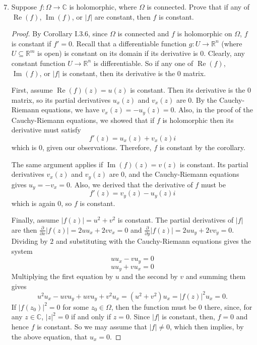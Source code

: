 \documentclass[10pt]{article}
\newcommand{\R}{\mathbb{R}}
\newcommand{\C}{\mathbb{C}}
\DeclareMathOperator*{\re}{Re}
\DeclareMathOperator*{\im}{Im}
\begin{document}

\begin{enumerate}
\setcounter{enumi}{6}
\item Suppose $f: \Omega \rightarrow \C$ is holomorphic, where $\Omega$ is connected.  Prove that if any of $\re(f)$, $\im(f)$, or $|f|$ are constant, then $f$ is constant.

\begin{proof}
By Corollary I.3.6, since $\Omega$ is connected and $f$ is holomorphic on $\Omega$, $f$ is constant if $f' = 0$.  Recall that a differentiable function $g: U \rightarrow \R^n$ (where $U \subseteq \R^m$ is open) is constant on its domain if its derivative is $0$.  Clearly, any constant function $U \rightarrow \R^n$ is differentiable.  So if any one of $\re(f)$, $\im(f)$, or $|f|$ is constant, then its derivative is the 0 matrix.

First, assume $\re(f)(z) = u(z)$ is constant.  Then its derivative is the 0 matrix, so its partial derivatives $u_x(z)$ and $v_x(z)$ are 0.  By the Cauchy-Riemann equations, we have $v_x(z) = -u_y(z) = 0$.  Also, in the proof of the Cauchy-Riemann equations, we showed that if $f$ is holomorphic then its derivative must satisfy
$$
f'(z) = u_x(z) + v_x(z)i
$$
which is 0, given our observations.  Therefore, $f$ is constant by the corollary.

The same argument applies if $\im(f)(z) = v(z)$ is constant.  Its partial derivatives $v_x(z)$ and $v_y(z)$ are 0, and the Cauchy-Riemann equations gives $u_y = -v_x = 0$.  Also, we derived that the derivative of $f$ must be
$$
f'(z) = v_y(z) - u_y(z)i
$$
which is again 0, so $f$ is constant.

Finally, assume $|f(z)| = u^2 + v^2$ is constant.  The partial derivatives of $|f|$ are then $\frac{\partial}{\partial x}|f(z)| = 2uu_x + 2vv_x = 0$ and $\frac{\partial}{\partial y}|f(z)| = 2uu_y + 2vv_y = 0$.  Dividing by $2$ and substituting with the Cauchy-Riemann equations gives the system
$$
uu_x - vu_y = 0
$$
$$
uu_y + vu_x = 0
$$
Multiplying the first equation by $u$ and the second by $v$ and summing them gives
$$
u^2u_x - uvu_y + uvu_y + v^2u_x = (u^2 + v^2)u_x = |f(z)|^2u_x = 0.
$$
If $|f(z_0)| ^2= 0$ for some $z_0 \in \Omega$, then the function must be 0 there, since, for any $z \in \C$, $|z|^2 = 0$ if and only if $z = 0$.  Since $|f|$ is constant, then, $f = 0$ and hence $f$ is constant.  So we may assume that $|f| \neq 0$, which then implies, by the above equation, that $u_x = 0$.


\end{proof}
\end{enumerate}
\end{document}
